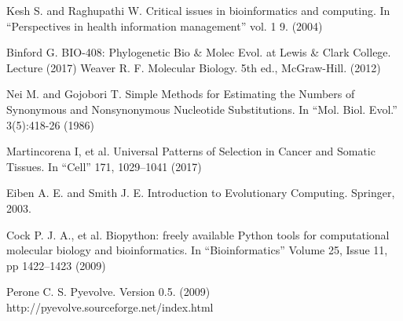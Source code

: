 \documentclass{article}
\begin{document}
  


\begin{thebibliography}{1}

	Kesh S. and Raghupathi W.  Critical issues in bioinformatics and computing. In “Perspectives in health information management” vol. 1 9. (2004)

Binford G. BIO-408: Phylogenetic Bio & Molec Evol. at Lewis & Clark College. Lecture (2017)
Weaver R. F. Molecular Biology. 5th ed., McGraw-Hill. (2012)

Nei M. and Gojobori T. Simple Methods for Estimating the Numbers of Synonymous and Nonsynonymous Nucleotide Substitutions. In “Mol. Biol. Evol.” 3(5):418-26 (1986) 

Martincorena I, et al. Universal Patterns of Selection in Cancer and Somatic Tissues. In “Cell” 171, 1029–1041 (2017)

Eiben A. E. and Smith J. E. Introduction to Evolutionary Computing. Springer, 2003.

Cock P. J. A., et al. Biopython: freely available Python tools for computational molecular biology and bioinformatics. In “Bioinformatics” Volume 25, Issue 11, pp 1422–1423 (2009)

Perone C. S. Pyevolve. Version 0.5. (2009) http://pyevolve.sourceforge.net/index.html


\end{thebibliography}
\end{document}
